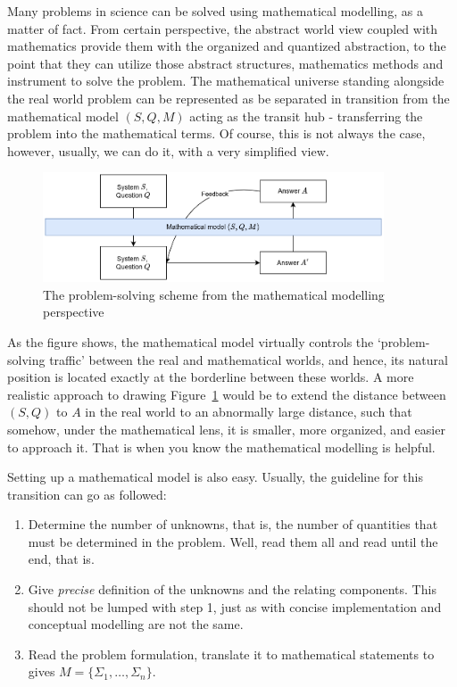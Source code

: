 Many problems in science can be solved using mathematical modelling, as a matter of fact. From certain perspective, the abstract world view coupled with mathematics provide them with the organized and quantized abstraction, to the point that they can utilize those abstract structures, mathematics methods and instrument to solve the problem. The mathematical universe standing alongside the real world problem can be represented as be separated in transition from the mathematical model $(S,Q,M)$ acting as the transit hub - transferring the problem into the mathematical terms. Of course, this is not always the case, however, usually, we can do it, with a very simplified view. 

\begin{figure}[h!]
    \centering
    \includegraphics[width=0.9\textwidth]{img/problemsolvingdiagram.drawio.png}
    \caption{The problem-solving scheme from the mathematical modelling perspective}
    \label{fig:problemsolving_mm}
\end{figure}

As the figure shows, the mathematical model virtually controls the `problem-solving traffic' between the real and mathematical worlds, and hence, its natural position is located exactly at the borderline between these worlds. A more realistic approach to drawing Figure~\ref{fig:problemsolving_mm} would be to extend the distance between $(S,Q)$ to $A$ in the real world to an abnormally large distance, such that somehow, under the mathematical lens, it is smaller, more organized, and easier to approach it. That is when you know the mathematical modelling is helpful. 

Setting up a mathematical model is also easy. Usually, the guideline for this transition can go as followed:
\begin{enumerate}[noitemsep, topsep=2pt]
    \item Determine the number of unknowns, that is, the number of quantities that must be determined in the problem. Well, read them all and read until the end, that is. 
    \item Give \textit{precise} definition of the unknowns and the relating components. This should not be lumped with step 1, just as with concise implementation and conceptual modelling are not the same. 
    \item Read the problem formulation, translate it to mathematical statements to gives $M=\{\Sigma_{1},\dots,\Sigma_{n}\}$. 
\end{enumerate}

